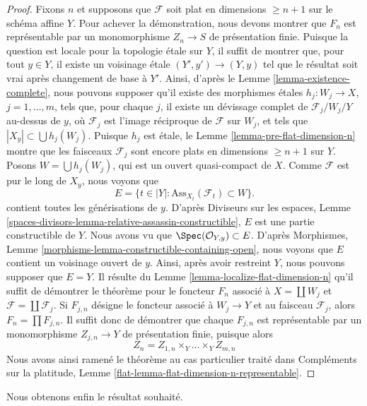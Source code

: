 \begin{proof}
\medskip\noindent
Fixons $n$ et supposons que $\mathcal{F}$ soit plat en dimensions $\geq n + 1$
sur le schéma affine $Y$.
Pour achever la démonstration, nous devons montrer que $F_n$ est représentable
par un monomorphisme $Z_n \to S$ de présentation finie.
Puisque la question est locale pour la topologie \'etale sur $Y$, il suffit de
montrer que, pour tout $y \in Y$, il existe un voisinage \'etale
$(Y', y') \to (Y, y)$ tel que le résultat soit vrai après changement de base à $Y'$.
Ainsi, d'après le
Lemme \ref{lemma-existence-complete},
nous pouvons supposer qu'il existe des morphismes \'etales $h_j : W_j \to X$,
$j = 1, \ldots, m$, tels que, pour chaque $j$, il existe un dévissage
complet de $\mathcal{F}_j/W_j/Y$ au-dessus de $y$,
où $\mathcal{F}_j$ est l'image réciproque de $\mathcal{F}$ sur $W_j$,
et tels que $|X_y| \subset \bigcup h_j(W_j)$. Puisque
$h_j$ est \'etale, le
Lemme \ref{lemma-pre-flat-dimension-n}
montre que les faisceaux $\mathcal{F}_j$ sont encore plats
en dimensions $\geq n + 1$ sur $Y$.
Posons $W = \bigcup h_j(W_j)$, qui est un ouvert quasi-compact de $X$.
Comme $\mathcal{F}$ est pur le long de $X_y$, nous voyons que
$$
E = \{t \in |Y| : \text{Ass}_{X_t}(\mathcal{F}_t) \subset W \}.
$$
contient toutes les générisations de $y$. D'après
Diviseurs sur les espaces,
Lemme \ref{spaces-divisors-lemma-relative-assassin-constructible},
$E$ est une partie constructible de $Y$. Nous avons vu que
$\Spec(\mathcal{O}_{Y, y}) \subset E$. D'après
Morphismes, Lemme \ref{morphisms-lemma-constructible-containing-open},
nous voyons que $E$ contient un voisinage ouvert de $y$.
Ainsi, après avoir restreint $Y$, nous pouvons supposer que $E = Y$.
Il résulte du
Lemme \ref{lemma-localize-flat-dimension-n}
qu'il suffit de démontrer le théorème pour le foncteur $F_n$ associé à
$X = \coprod W_j$ et $\mathcal{F} = \coprod \mathcal{F}_j$.
Si $F_{j, n}$ désigne le foncteur associé à $W_j \to Y$ et au faisceau
$\mathcal{F}_j$, alors $F_n = \prod F_{j, n}$. Il suffit donc
de démontrer que chaque $F_{j, n}$ est représentable par un monomorphisme
$Z_{j, n} \to Y$ de présentation finie, puisque alors
$$
Z_n = Z_{1, n} \times_Y \ldots \times_Y Z_{m, n}
$$
Nous avons ainsi ramené le théorème au cas particulier traité dans
Compléments sur la platitude, Lemme \ref{flat-lemma-flat-dimension-n-representable}.
\end{proof}

\noindent
Nous obtenons enfin le résultat souhaité.

